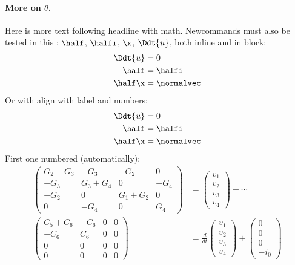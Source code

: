 \documentclass[%
oneside,                 %
final,                   %
10pt]{article}
\theoremstyle{definition}
\begin{document}
\begin{enumerate}
\paragraph{More on $\theta$.}
Here is more text following headline with math.
Newcommands must also be tested in this \report:
$\half$, $\halfi$, $\x$, $\Ddt{u}$,
both inline and in block:
\begin{align}
\Ddt{u} &= 0\nonumber
\\ 
\half &= \halfi\\ 
\half\x &= \normalvec
\end{align}
Or with align with label and numbers:
\begin{align}
\Ddt{u} &= 0
\label{aligneq1}
\\ 
\half &= \halfi\\ 
\half\x &= \normalvec
\label{aligneq2}
\end{align}
First one numbered (automatically):
\begin{align}
\begin{pmatrix}
G_2 + G_3 & -G_3 & -G_2 & 0 \\ 
-G_3 & G_3 + G_4 & 0 & -G_4 \\ 
-G_2 & 0 & G_1 + G_2 & 0 \\ 
0 & -G_4 & 0 & G_4
\end{pmatrix}
&=
\begin{pmatrix}
 v_1 \\ 
 v_2 \\ 
 v_3 \\ 
 v_4
\end{pmatrix}
+ \cdots \\ 
\begin{pmatrix}
 C_5 + C_6 & -C_6 & 0 & 0 \\ 
 -C_6 & C_6 & 0 & 0 \\ 
 0 & 0 & 0 & 0 \\ 
 0 & 0 & 0 & 0
\end{pmatrix}
  &= \frac{d}{dt}\begin{pmatrix}
 v_1 \\ 
 v_2 \\ 
 v_3 \\ 
 v_4
\end{pmatrix} +
\begin{pmatrix}
 0 \\ 
 0 \\ 
 0 \\ 
 -i_0
\end{pmatrix}

\end{align}
\end{enumerate}
\end{document}

